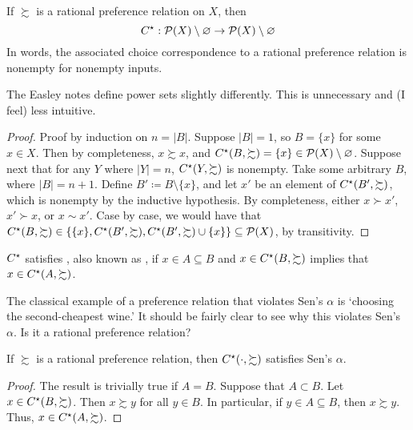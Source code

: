 \documentclass[12pt]{article}
\begin{document}
\begin{proposition}\label{prop:rational_choice_nonempty}
	If $\succsim$ is a rational preference relation on $X$, then
	\[
	C^\star : \mathcal{P}(X) \setminus \mathop{\varnothing} \to \mathcal{P}(X) \setminus \mathop{\varnothing} 
	\]
	In words, the associated choice correspondence to a rational preference relation is nonempty for nonempty inputs.
\end{proposition}
\begin{remark}
	The Easley notes define power sets slightly differently. This is unnecessary and (I feel) less intuitive.
\end{remark}
\begin{proof}
	Proof by induction on $n = |B|$. Suppose $|B| = 1$, so $B = \{x\}$ for some $x \in X$. Then by completeness, $x \succsim x$, and $C^\star(B,\succsim) = \{x\} \in \mathcal{P}(X) \setminus \mathop{\varnothing}$. Suppose next that for any $Y$ where $|Y| = n$, $C^\star(Y,\succsim)$ is nonempty. Take some arbitrary $B$, where $|B| = n + 1$. Define $B'\coloneqq B \setminus \{x\}$, and let $x'$ be an element of $C^\star(B',\succsim)$, which is nonempty by the inductive hypothesis. By completeness, either $x \succ x'$, $x' \succ x$, or $x \sim x'$. Case by case, we would have that $C^\star(B,\succsim) \in \left\{\{x\},C^\star(B',\succsim),C^\star(B',\succsim) \cup \{x\}\right\} \subseteq \mathcal{P}(X)$, by transitivity.
\end{proof}

\begin{definition}
	$C^\star$ satisfies , also known as , if $x \in A \subseteq B$ and $x \in C^\star(B,\succsim)$ implies that $x \in C^\star(A,\succsim)$.
\end{definition}
\begin{remark}
	The classical example of a preference relation that violates Sen's $\alpha$ is `choosing the second-cheapest wine.' It should be fairly clear to see why this violates Sen's $\alpha$. Is it a rational preference relation?
\end{remark}

\begin{proposition}\label{prop:rational_alpha}
	If $\succsim$ is a rational preference relation, then $C^\star(\cdot,\succsim)$ satisfies Sen's $\alpha$.
\end{proposition}
\begin{proof}
	The result is trivially true if $A = B$. Suppose that $A \subset B$. Let $x \in C^\star(B,\succsim)$. Then $x \succsim y$ for all $y \in B$. In particular, if $y \in A \subseteq B$, then $x \succsim y$. Thus, $x \in C^\star(A,\succsim)$.
\end{proof}
\end{document}
